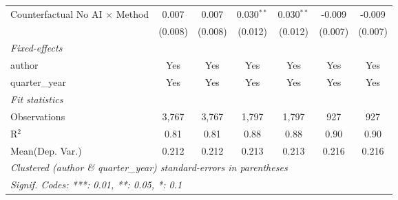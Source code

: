 \begin{tabular}{lcccccc}
   Counterfactual No AI $\times$ Method  & 0.007         & 0.007         & 0.030$^{**}$   & 0.030$^{**}$   & -0.009    & -0.009\\   
                                         & (0.008)       & (0.008)       & (0.012)        & (0.012)        & (0.007)   & (0.007)\\   
   \midrule
   \emph{Fixed-effects}\\
   author                                & Yes           & Yes           & Yes            & Yes            & Yes       & Yes\\  
   quarter\_year                         & Yes           & Yes           & Yes            & Yes            & Yes       & Yes\\  
   \midrule
   \emph{Fit statistics}\\
   Observations                          & 3,767         & 3,767         & 1,797          & 1,797          & 927       & 927\\  
   R$^2$                                 & 0.81          & 0.81          & 0.88           & 0.88           & 0.90      & 0.90\\  
Mean(Dep. Var.) & 0.212 & 0.212 & 0.213 & 0.213 & 0.216 & 0.216 \\
   \midrule \midrule
   \multicolumn{7}{l}{\emph{Clustered (author \& quarter\_year) standard-errors in parentheses}}\\
   \multicolumn{7}{l}{\emph{Signif. Codes: ***: 0.01, **: 0.05, *: 0.1}}\\
\end{tabular}
\par\endgroup
